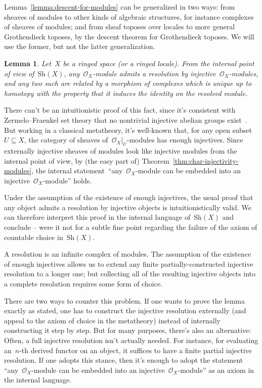 \documentclass[10pt,reqno,a4paper]{amsbook}
\makeatletter
\theoremstyle{definition}
\theoremstyle{plain}
\newtheorem{lemma}[defn]{Lemma}
\theoremstyle{remark}
\renewcommand{\O}{\mathcal{O}}
\newcommand{\Sh}{\mathrm{Sh}}
\newcommand{\?}{\,{:}\,}
\renewcommand{\_}{\mathpunct{.}\,}
\renewenvironment{proof}[1][\proofname]{\par
  \pushQED{\qed}%
  \normalfont \topsep6\p@\@plus6\p@\relax
  \trivlist
  \item[\hskip\labelsep
        \itshape
    #1\@addpunct{.}]\ignorespaces
}{%
  \popQED\endtrivlist\@endpefalse
}
\makeatother
\begin{document}
Lemma~\ref{lemma:descent-for-modules} can be generalized in two
ways: from sheaves of modules to other kinds of algebraic structures, for
instance complexes of sheaves of modules; and from sheaf toposes over locales
to more general Grothendieck toposes, by the descent theorem for Grothendieck
toposes. We will use the former, but not the latter generalization.

\begin{lemma}\label{lemma:internal-resolutions}
Let~$X$ be a ringed space (or a ringed locale). From the internal point of view
of~$\Sh(X)$, any~$\O_X$-module admits a resolution by injective~$\O_X$-modules,
and any two such are related by a morphism of complexes which is unique up to
homotopy with the property that it induces the identity on the resolved module.
\end{lemma}

\begin{proof}There can't be an intuitionistic proof of this fact, since it's
consistent with Zermelo--Fraenkel set theory
that no nontrivial injective abelian groups exist~\cite{blass:inj-proj-axc}.
But working in a classical metatheory, it's well-known that, for any open
subset~$U \subseteq X$, the category of sheaves of~$\O_X|_U$-modules has enough
injectives. Since externally injective sheaves of modules look like injective
modules from the internal point of view, by (the easy part of)
Theorem~\ref{thm:char-injectivity-modules}, the internal
statement~``any~$\O_X$-module can be embedded into an injective~$\O_X$-module''
holds.

Under the assumption of the existence of enough injectives, the usual proof
that any object admits a resolution by injective objects is intuitionistically
valid. We can therefore interpret this proof in the internal language
of~$\Sh(X)$ and conclude -- were it not for a subtle fine point regarding the
failure of the axiom of countable choice in~$\Sh(X)$.

A resolution is an infinite complex of modules. The assumption of the existence
of enough injectives allows us to extend any finite partially-constructed
injective resolution to a longer one; but collecting all of the resulting
injective objects into a complete resolution requires some form of choice.

There are two ways to counter this problem. If one wants to prove the lemma
exactly as stated, one has to construct the injective resolution externally
(and appeal to the axiom of choice in the metatheory) instead of internally
constructing it step by step. But for many purposes, there's also an
alternative: Often, a full injective resolution isn't actually needed. For
instance, for evaluating an~$n$-th derived functor on an object, it suffices
to have a finite partial injective resolution. If one adopts this stance, then
it's enough to adopt the statement ``any~$\O_X$-module can be embedded into an
injective~$\O_X$-module'' as an axiom in the internal language.
\end{proof}
\end{document}
